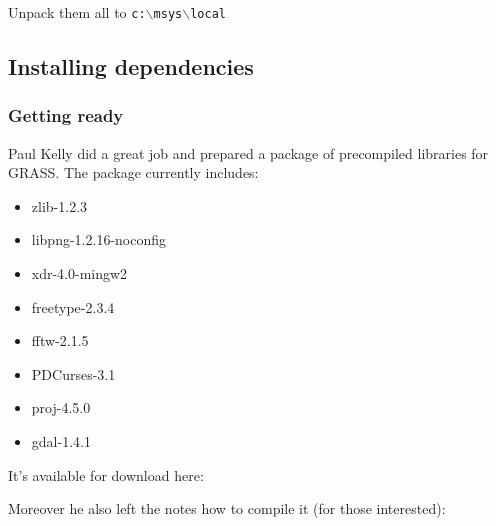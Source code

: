 	\begin{quotation}
	\end{quotation}

	\begin{quotation}
	\end{quotation}

Unpack them all to \texttt{c:$\backslash$msys$\backslash$local}

\subsection{Installing dependencies}
\subsubsection{Getting ready}
Paul Kelly did a great job and prepared a package of precompiled libraries for GRASS.
The package currently includes:

\begin{itemize}
\item zlib-1.2.3
\item libpng-1.2.16-noconfig
\item xdr-4.0-mingw2
\item freetype-2.3.4
\item fftw-2.1.5
\item PDCurses-3.1
\item proj-4.5.0
\item gdal-1.4.1
\end{itemize}

It's available for download here:

	\begin{quotation}
	\end{quotation}

Moreover he also left the notes how to compile it (for those interested):

	\begin{quotation}
	\end{quotation}

